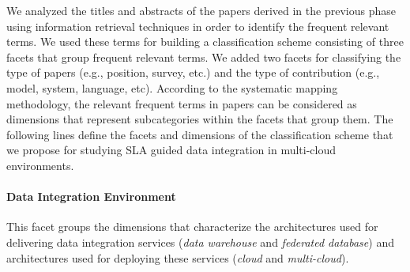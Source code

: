 We analyzed the titles and abstracts of the  papers derived in the previous phase using information retrieval techniques in order to identify the frequent relevant terms. We used these terms for building a classification scheme consisting of three facets that group frequent relevant terms. We added two facets for classifying the type of papers (e.g., position, survey, etc.) and the type of contribution (e.g., model, system, language, etc). According to the systematic mapping methodology, the relevant frequent terms in papers can be considered as dimensions that represent subcategories within the facets that group them. The following lines define the facets and dimensions of the classification scheme that we propose for studying SLA guided data integration in multi-cloud environments.

\paragraph{Data Integration Environment}  
This facet groups the dimensions that characterize the architectures used for delivering data integration services ({\em data warehouse} and  {\em federated database}) and  architectures used for deploying these services ({\em cloud} and {\em multi-cloud}).

